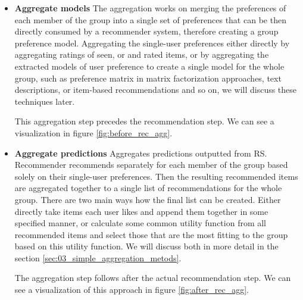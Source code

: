 \begin{itemize}
    \item \textbf{Aggregate models} \newline
    The aggregation works on merging the preferences of each member of the group into a single set of preferences that can be then directly consumed by a recommender system, therefore creating a group preference model. Aggregating the single-user preferences either directly by aggregating ratings of seen, or and rated items, or by aggregating the extracted models of user preference to create a single model for the whole group, such as preference matrix in matrix factorization approaches, text descriptions, or item-based recommendations and so on, we will discuss these techniques later.
    
    
    This aggregation step precedes the recommendation step. We can see a visualization in figure \ref{fig:before_rec_agg}.
    
    
    \item \textbf{Aggregate predictions} \newline
     Aggregates predictions outputted from RS. Recommender recommends separately for each member of the group based solely on their single-user preferences. Then the resulting recommended items are aggregated together to a single list of recommendations for the whole group. There are two main ways how the final list can be created. Either directly take items each user likes and append them together in some specified manner, or calculate some common utility function from all recommended items and select those that are the most fitting to the group based on this utility function. We will discuss both in more detail in the section \ref{sec:03_simple_aggregation_metods}.
     
     The aggregation step follows after the actual recommendation step. We can see a visualization of this approach in figure \ref{fig:after_rec_agg}.
     

\end{itemize}
